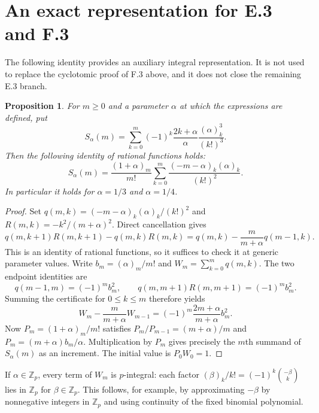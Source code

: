 \documentclass[11pt,letterpaper]{article}
\newtheorem{proposition}[theorem]{Proposition}
\numberwithin{equation}{section}
\newcommand{\Zp}{\mathbb Z_p}
\begin{document}
\section{An exact representation for E.3 and F.3}\label{loc-III-A}\label{III-app:EF}
The following identity provides an auxiliary integral representation.
It is not used to replace the cyclotomic proof of F.3 above, and it
does not close the remaining E.3 branch.

\begin{proposition}
For $m\ge0$ and a parameter $\alpha$ at which the expressions are
defined, put
\[
 S_\alpha(m)=\sum_{k=0}^m(-1)^k\frac{2k+\alpha}{\alpha}
                         \frac{(\alpha)_k^3}{(k!)^3}.
\]
Then the following identity of rational functions holds:
\[
 \boxed{S_\alpha(m)=\frac{(1+\alpha)_m}{m!}
      \sum_{k=0}^m\frac{(-m-\alpha)_k(\alpha)_k}{(k!)^2}.}
\]
In particular it holds for $\alpha=1/3$ and $\alpha=1/4$.
\end{proposition}
\begin{proof}
Set $q(m,k)=(-m-\alpha)_k(\alpha)_k/(k!)^2$ and
$R(m,k)=-k^2/(m+\alpha)^2$. Direct cancellation gives
\[
 q(m,k+1)R(m,k+1)-q(m,k)R(m,k)
 =q(m,k)-\frac{m}{m+\alpha}q(m-1,k).
\]
This is an identity of rational functions, so it suffices to check
it at generic parameter values. Write $b_m=(\alpha)_m/m!$ and
$W_m=\sum_{k=0}^m q(m,k)$. The two endpoint identities are
\[
 q(m-1,m)=(-1)^m b_m^2,
 \qquad q(m,m+1)R(m,m+1)=(-1)^m b_m^2.
\]
Summing the certificate for $0\le k\le m$ therefore yields
\[
 W_m-\frac{m}{m+\alpha}W_{m-1}
 =(-1)^m\frac{2m+\alpha}{m+\alpha}b_m^2.
\]
Now $P_m=(1+\alpha)_m/m!$ satisfies
$P_m/P_{m-1}=(m+\alpha)/m$ and
$P_m=(m+\alpha)b_m/\alpha$. Multiplication by $P_m$
gives precisely the $m$th summand of $S_\alpha(m)$ as an
increment. The initial value is $P_0W_0=1$.
\end{proof}

If $\alpha\in\Zp$, every term of $W_m$ is $p$-integral: each
factor $(\beta)_k/k!=(-1)^k\binom{-\beta}{k}$ lies in $\Zp$
for $\beta\in\Zp$. This follows, for example, by approximating
$-\beta$ by nonnegative integers in $\Zp$ and using continuity
of the fixed binomial polynomial.
\end{document}
